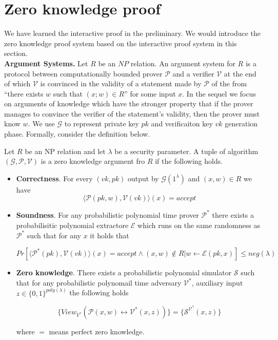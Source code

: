 
\section{Zero knowledge proof}\label{ZKP}

We have learned the interactive proof in the preliminary. We would introduce the zero knowledge proof system based on the interactive proof system in this section.\\

\noindent
\textbf{Argument Systems.} Let $R$ be an $NP$ relation. An argument system for $R$ is a protocol between
computationally bounded prover $\mathcal{P}$ and a verifier $\mathcal{V}$ at the end of which $\mathcal{V}$ is convinced in the validity of a statement made by $\mathcal{P}$ of the from “there exists $w$ such that $(x; w) \in R$” for some input $x$. In the sequel we focus on arguments of knowledge which have the stronger property that if the prover manages to convince
the verifier of the statement’s validity, then the prover must know $w$. We use $\mathcal{G}$ to represent private key $pk$ and verificaiton key $vk$ generation phase. Formally, consider the definition below.

\begin{definition}\label{def::zkpd}

Let $R$ be an NP relation and let $\lambda$ be a security parameter. A tuple of algorithm $(\mathcal{G}, \mathcal{P}, \mathcal{V})$ is a zero knowledge argument fro $R$ if the following holds.

\begin{itemize}

\item \textbf{Correctness}. For every $(vk, pk)$ output by $\mathcal{G}(1^\lambda)$ and $(x, w) \in R$ we have
$$\langle \mathcal{P}(pk, w), \mathcal{V}(vk) \rangle(x) = accept$$

\item \textbf{Soundness}. For any probabilistic polynomial time prover $\mathcal{P^*}$ there exists a probabilisitic polynomial extractore $\mathcal{E}$ which runs on the same randomness as $\mathcal{P^*}$ such that for any $x$ it holds that

$$Pr[\langle\mathcal{P^*}(pk), \mathcal{V}(vk) \rangle(x) = accept \wedge (x, w) \notin R | w \leftarrow \mathcal{E}(pk, x)] \leq neg(\lambda)$$

\item \textbf{Zero knowledge}. There exists a probabilistic polynomial simulator $\mathcal{S}$ such that for any probabilistic polynomail time adversary $\mathcal{V^*}$, auxiliary input $z \in \{0, 1\}^{poly(\lambda)}$ the following holds

$$\{View_{V^*}(\mathcal{P}(x, w) \leftrightarrow \mathcal{V^*}(x, z))\} = \{\mathcal{S}^{\mathcal{V^*}}(x, z)\}$$

where $=$ means perfect zero knowledge. 

\end{itemize}

\end{definition}